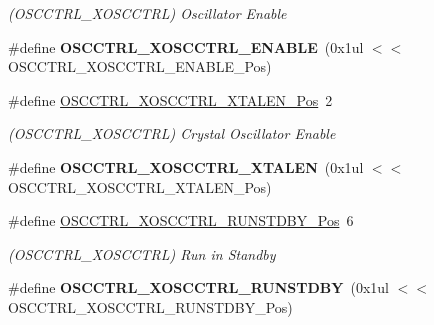\begin{DoxyCompactItemize}
\begin{DoxyCompactList}\small\item\em (O\+S\+C\+C\+T\+R\+L\+\_\+\+X\+O\+S\+C\+C\+T\+R\+L) Oscillator Enable \end{DoxyCompactList}\item 
\hypertarget{group___s_a_m_l21___o_s_c_c_t_r_l_gad2335f53a6b6c117246c9a7262734548}{}\#define {\bfseries O\+S\+C\+C\+T\+R\+L\+\_\+\+X\+O\+S\+C\+C\+T\+R\+L\+\_\+\+E\+N\+A\+B\+L\+E}~(0x1ul $<$$<$ O\+S\+C\+C\+T\+R\+L\+\_\+\+X\+O\+S\+C\+C\+T\+R\+L\+\_\+\+E\+N\+A\+B\+L\+E\+\_\+\+Pos)\label{group___s_a_m_l21___o_s_c_c_t_r_l_gad2335f53a6b6c117246c9a7262734548}

\item 
\hypertarget{group___s_a_m_l21___o_s_c_c_t_r_l_ga46fe198075472a490bede30dd47abddd}{}\#define \hyperlink{group___s_a_m_l21___o_s_c_c_t_r_l_ga46fe198075472a490bede30dd47abddd}{O\+S\+C\+C\+T\+R\+L\+\_\+\+X\+O\+S\+C\+C\+T\+R\+L\+\_\+\+X\+T\+A\+L\+E\+N\+\_\+\+Pos}~2\label{group___s_a_m_l21___o_s_c_c_t_r_l_ga46fe198075472a490bede30dd47abddd}

\begin{DoxyCompactList}\small\item\em (O\+S\+C\+C\+T\+R\+L\+\_\+\+X\+O\+S\+C\+C\+T\+R\+L) Crystal Oscillator Enable \end{DoxyCompactList}\item 
\hypertarget{group___s_a_m_l21___o_s_c_c_t_r_l_gae84ba065fa75fce0735479e4bd2239e8}{}\#define {\bfseries O\+S\+C\+C\+T\+R\+L\+\_\+\+X\+O\+S\+C\+C\+T\+R\+L\+\_\+\+X\+T\+A\+L\+E\+N}~(0x1ul $<$$<$ O\+S\+C\+C\+T\+R\+L\+\_\+\+X\+O\+S\+C\+C\+T\+R\+L\+\_\+\+X\+T\+A\+L\+E\+N\+\_\+\+Pos)\label{group___s_a_m_l21___o_s_c_c_t_r_l_gae84ba065fa75fce0735479e4bd2239e8}

\item 
\hypertarget{group___s_a_m_l21___o_s_c_c_t_r_l_gae633882a1d2a6b483181e4256d074c0e}{}\#define \hyperlink{group___s_a_m_l21___o_s_c_c_t_r_l_gae633882a1d2a6b483181e4256d074c0e}{O\+S\+C\+C\+T\+R\+L\+\_\+\+X\+O\+S\+C\+C\+T\+R\+L\+\_\+\+R\+U\+N\+S\+T\+D\+B\+Y\+\_\+\+Pos}~6\label{group___s_a_m_l21___o_s_c_c_t_r_l_gae633882a1d2a6b483181e4256d074c0e}

\begin{DoxyCompactList}\small\item\em (O\+S\+C\+C\+T\+R\+L\+\_\+\+X\+O\+S\+C\+C\+T\+R\+L) Run in Standby \end{DoxyCompactList}\item 
\hypertarget{group___s_a_m_l21___o_s_c_c_t_r_l_ga7e22470524990811d5894ae801b9092b}{}\#define {\bfseries O\+S\+C\+C\+T\+R\+L\+\_\+\+X\+O\+S\+C\+C\+T\+R\+L\+\_\+\+R\+U\+N\+S\+T\+D\+B\+Y}~(0x1ul $<$$<$ O\+S\+C\+C\+T\+R\+L\+\_\+\+X\+O\+S\+C\+C\+T\+R\+L\+\_\+\+R\+U\+N\+S\+T\+D\+B\+Y\+\_\+\+Pos)\label{group___s_a_m_l21___o_s_c_c_t_r_l_ga7e22470524990811d5894ae801b9092b}


\end{DoxyCompactItemize}
